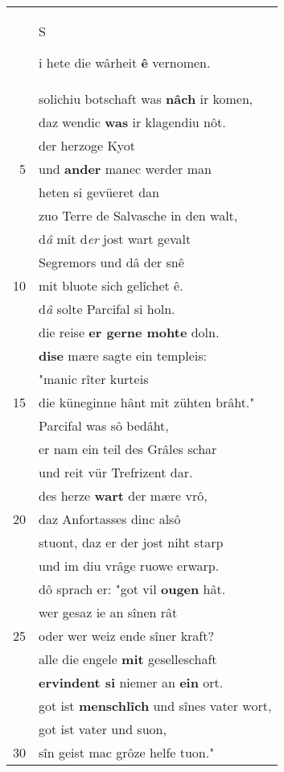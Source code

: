\documentclass[8pt,a4paper,notitlepage]{article}
\begin{document}
\begin{table}[ht]
\begin{minipage}[t]{0.5\linewidth}
\begin{center}
\end{center}
\begin{tabular}{rl}
 & \begin{large}S\end{large}i hete die wârheit \textbf{ê} vernomen.\\ 
 & solichiu botschaft was \textbf{nâch} ir komen,\\ 
 & daz wendic \textbf{was} ir klagendiu nôt.\\ 
 & der herzoge Kyot\\ 
5 & und \textbf{ander} manec werder man\\ 
 & heten si gevüeret dan\\ 
 & zuo Terre de Salvasche in den walt,\\ 
 & d\textit{â} mit d\textit{er} jost wart gevalt\\ 
 & Segremors und dâ der snê\\ 
10 & mit bluote sich gelîchet ê.\\ 
 & d\textit{â} solte Parcifal si holn.\\ 
 & die reise \textbf{er gerne mohte} doln.\\ 
 & \textbf{dise} mære sagte ein templeis:\\ 
 & "manic rîter kurteis\\ 
15 & die küneginne hânt mit zühten brâht."\\ 
 & Parcifal was sô bedâht,\\ 
 & er nam ein teil des Grâles schar\\ 
 & und reit vür Trefrizent dar.\\ 
 & des herze \textbf{wart} der mære vrô,\\ 
20 & daz Anfortasses dinc alsô\\ 
 & stuont, daz er der jost niht starp\\ 
 & und im diu vrâge ruowe erwarp.\\ 
 & dô sprach er: "got vil \textbf{ougen} hât.\\ 
 & wer gesaz ie an sînen rât\\ 
25 & oder wer weiz ende sîner kraft?\\ 
 & alle die engele \textbf{mit} geselleschaft\\ 
 & \textbf{ervindent si} niemer an \textbf{ein} ort.\\ 
 & got ist \textbf{menschlîch} und sînes vater wort,\\ 
 & got ist vater und suon,\\ 
30 & sîn geist mac grôze helfe tuon."\\ 

\end{tabular}
\end{minipage}
\end{table}
\end{document}
